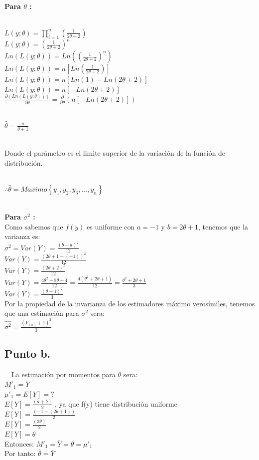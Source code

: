 \documentclass[letterpaper,12pt,onecolumn,titlepage]{article}
\begin{document}
~\\ \textbf{Para $\theta$ :}

~\\ $L(y;\theta) = \prod\limits_{i=1}^n{}(\frac{1}{2\theta +2})$
~\\ $L(y;\theta) = (\frac{1}{2\theta +2})^{n}$
~\\ $Ln(L(y;\theta)) = Ln((\frac{1}{2\theta +2})^{n})$
~\\ $Ln(L(y;\theta)) = n[Ln(\frac{1}{2\theta +2})]$
~\\ $Ln(L(y;\theta)) = n[Ln(1)-Ln({2\theta+2})]$
~\\ $Ln(L(y;\theta)) = n[-Ln({2\theta+2})]$
~\\ $\frac{\partial (Ln(L(y;\theta)))}{\partial\theta} = \frac{\partial}{\partial\theta}(n[-Ln({2\theta+2})])$

~\\ $\hat{\theta} = \frac{n}{\theta+1}$

~\\ Donde el par\'{a}metro es el limite superior de la variaci\'{o}n de la funci\'{o}n de distribuci\'{o}n. 

~\\ $\therefore \hat{\theta} = Maximo \left\lbrace{y_{1}, y_{2}, y_{3},...,y_{n}}\right\rbrace$ 

~\\ \textbf{Para $\sigma^{2}$ :}
~\\ Como sabemos que $f(y)$ es uniforme con $a=-1$ y $b=2\theta+1$, tenemos que la varianza es:
~\\ $\sigma^{2} = Var(Y) = \frac{(b-a)^2}{12}$
~\\ $Var(Y) = \frac{(2\theta+1-(-1))^2}{12}$
~\\ $Var(Y) = \frac{(2\theta+2)^2}{12}$
~\\ $Var(Y) = \frac{4\theta^2 +8\theta+4}{12}=\frac{4(\theta^2 +2\theta+1)}{12}=\frac{\theta^2 +2\theta+1}{3}$
~\\ $Var(Y) = \frac{(\theta+1)^2}{3}$
~\\ Por la propiedad de la invarianza de los estimadores m\'{a}ximo veros\'{i}miles, tenemos que una estimaci\'{o}n para $\sigma^2$ sera:
~\\ $\hat{\sigma^2}=\frac{(Y_{(n)}+1)^2}{3}$

\subsection{Punto b.}
~\ La estimaci\'{o}n por momentos para $\theta$ sera:
~\\ $M'_1=\bar{Y}$
~\\ $\mu'_1=E[Y]=?$
~\\ $E[Y]= \frac{(a+b)}{2}$  , ya que f(y) tiene distribuci\'{o}n uniforme
~\\ $E[Y]= \frac{(-1+(2\theta+1))}{2}$
~\\ $E[Y]= \frac{(2\theta)}{2}$
~\\ $E[Y]= \theta$
~\\ Entonces: $M'_1=\bar{Y}=\theta=\mu'_1$
~\\ Por tanto: $\hat{\theta}=\bar{Y}$


\end{document}
